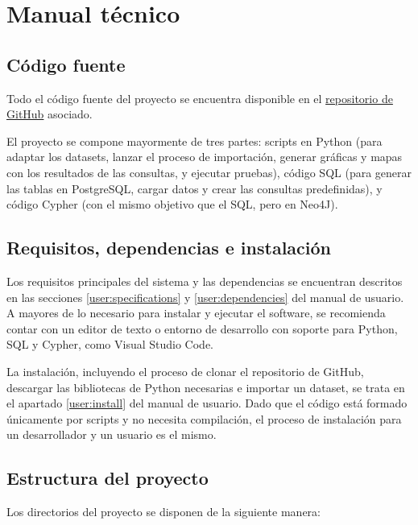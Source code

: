 
\chapter{Manual técnico} \label{appendix:development}

\section{Código fuente}

Todo el código fuente del proyecto se encuentra disponible en el \href{https://github.com/rodrada/TFG}{repositorio de GitHub} asociado.

El proyecto se compone mayormente de tres partes: scripts en Python (para adaptar los datasets, lanzar el proceso de importación, generar gráficas y mapas con los resultados de las consultas, y ejecutar pruebas), código SQL (para generar las tablas en PostgreSQL, cargar datos y crear las consultas predefinidas), y código Cypher (con el mismo objetivo que el SQL, pero en Neo4J).

\section{Requisitos, dependencias e instalación}

Los requisitos principales del sistema y las dependencias se encuentran descritos en las secciones \ref{user:specifications} y \ref{user:dependencies} del manual de usuario. A mayores de lo necesario para instalar y ejecutar el software, se recomienda contar con un editor de texto o entorno de desarrollo con soporte para Python, SQL y Cypher, como Visual Studio Code.

La instalación, incluyendo el proceso de clonar el repositorio de GitHub,  descargar las bibliotecas de Python necesarias e importar un dataset, se trata en el apartado \ref{user:install} del manual de usuario. Dado que el código está formado únicamente por scripts y no necesita compilación, el proceso de instalación para un desarrollador y un usuario es el mismo.

\clearpage

\section{Estructura del proyecto}

Los directorios del proyecto se disponen de la siguiente manera:

\vspace{0.5em}

